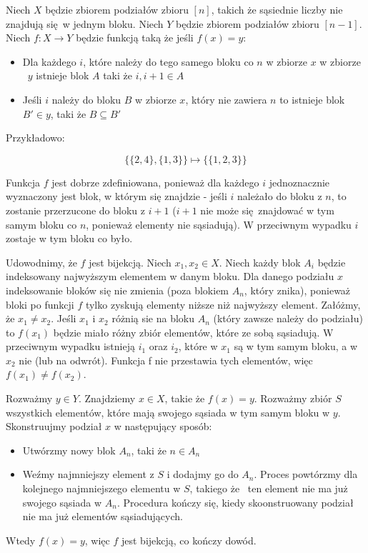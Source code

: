 \documentclass{mwart}
\begin{document}
\begin{mdframed}
    Niech $X$ będzie zbiorem podziałów zbioru $[n]$, takich że sąsiednie liczby nie 
    znajdują się w jednym bloku. Niech $Y$ będzie zbiorem podziałów zbioru $[n - 1]$. 
    Niech $ f : X \rightarrow Y$ będzie funkcją taką że jeśli $f(x) = y$:
    \begin{itemize}
        \item Dla każdego $i$, które należy do tego samego bloku co $n$ w zbiorze $x$ w zbiorze \
        $y$ istnieje blok $A$ taki że $i, i + 1 \in A$
        \item Jeśli $i$ należy do bloku $B$ w zbiorze $x$, który nie zawiera $n$ to istnieje blok \
        $B' \in y$, taki że $B \subseteq B'$
    \end{itemize}
    Przykładowo:
    
    $$\
    \{\{2, 4\}, \{1, 3\}\} \mapsto \{\{1, 2, 3\}\} \
    $$

    Funkcja $f$ jest dobrze zdefiniowana, ponieważ dla każdego $i$ jednoznacznie wyznaczony jest blok, 
    w którym się znajdzie - jeśli $i$ należało do bloku z $n$, to zostanie przerzucone do bloku z $i + 1$ 
    ($i + 1$ nie może się znajdować w tym samym bloku co $n$, ponieważ elementy nie sąsiadują). W przeciwnym 
    wypadku $i$ zostaje w tym bloku co było.

    Udowodnimy, że $f$ jest bijekcją. Niech $x_1, x_2 \in X$. Niech każdy blok $A_i$ będzie indeksowany najwyższym elementem 
    w danym bloku. Dla danego podziału $x$ indeksowanie bloków się nie zmienia (poza blokiem $A_n$, który znika), ponieważ 
    bloki po funkcji $f$ tylko zyskują elementy niższe niż najwyższy element. Załóżmy, że $x_1 \neq x_2$. Jeśli $x_1$ i $x_2$ 
    różnią sie na bloku $A_n$ (który zawsze należy do podziału) to $f(x_1)$ będzie miało różny zbiór elementów, które ze sobą sąsiadują.
    W przeciwnym wypadku istnieją $i_1$ oraz $i_2$, które w $x_1$ są w tym samym bloku, a w $x_2$ nie (lub na odwrót). Funkcja f nie 
    przestawia tych elementów, więc $f(x_1) \neq f(x_2)$.

    Rozważmy $y \in Y$. Znajdziemy $x \in X$, takie że $f(x) = y$. Rozważmy zbiór $S$ wszystkich elementów, które mają swojego sąsiada w tym 
    samym bloku w $y$. Skonstruujmy podział $x$ w następujący sposób:

    \begin{itemize}
        \item Utwórzmy nowy blok $A_n$, taki że $n \in A_n$
        \item Weźmy najmniejszy element z $S$ i dodajmy go do $A_n$. Proces powtórzmy dla kolejnego najmniejszego elementu w $S$, takiego że \
        ten element nie ma już swojego sąsiada w $A_n$. Procedura kończy się, kiedy skoonstruowany podział nie ma już elementów sąsiadujących.
    \end{itemize}

    Wtedy $f(x) = y$, więc $f$ jest bijekcją, co kończy dowód.

\end{mdframed}
\end{document}
